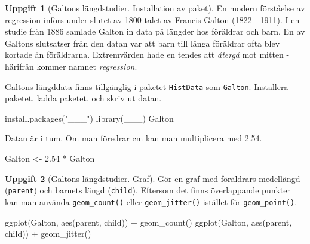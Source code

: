 \documentclass[
]{book}
\newenvironment{Shaded}{\begin{snugshade}}{\end{snugshade}}
\newcommand{\FloatTok}[1]{\textcolor[rgb]{0.00,0.00,0.81}{#1}}
\newcommand{\FunctionTok}[1]{\textcolor[rgb]{0.00,0.00,0.00}{#1}}
\newcommand{\NormalTok}[1]{#1}
\newcommand{\OtherTok}[1]{\textcolor[rgb]{0.56,0.35,0.01}{#1}}
\newcommand{\SpecialCharTok}[1]{\textcolor[rgb]{0.00,0.00,0.00}{#1}}
\newcommand{\StringTok}[1]{\textcolor[rgb]{0.31,0.60,0.02}{#1}}
\theoremstyle{definition}
\theoremstyle{definition}
\theoremstyle{definition}
\newtheorem{exercise}{Uppgift}[chapter]
\theoremstyle{definition}
\theoremstyle{remark}
\begin{document}
\begin{exercise}[Galtons längdstudier. Installation av paket]

En modern förståelse av regression införs under slutet av 1800-talet av Francis Galton (1822 - 1911). I en studie från 1886 samlade Galton in data på längder hos föräldrar och barn. En av Galtons slutsatser från den datan var att barn till långa föräldrar ofta blev kortade än föräldrarna. Extremvärden hade en tendes att \emph{återgå} mot mitten - härifrån kommer namnet \emph{regression}.

Galtons längddata finns tillgänglig i paketet \texttt{HistData} som \texttt{Galton}. Installera paketet, ladda paketet, och skriv ut datan.

\begin{Shaded}
\begin{Highlighting}[]
\FunctionTok{install.packages}\NormalTok{(}\StringTok{"\_\_\_"}\NormalTok{)}
\FunctionTok{library}\NormalTok{(\_\_\_)}
\NormalTok{Galton}
\end{Highlighting}
\end{Shaded}

Datan är i tum. Om man föredrar cm kan man multiplicera med 2.54.

\begin{Shaded}
\begin{Highlighting}[]
\NormalTok{Galton }\OtherTok{\textless{}{-}} \FloatTok{2.54} \SpecialCharTok{*}\NormalTok{ Galton}
\end{Highlighting}
\end{Shaded}

\end{exercise}

\begin{exercise}[Galtons längdstudier. Graf]

Gör en graf med föräldrars medellängd (\texttt{parent}) och barnets längd (\texttt{child}). Eftersom det finns överlappande punkter kan man använda \texttt{geom\_count()} eller \texttt{geom\_jitter()} istället för \texttt{geom\_point()}.

\begin{Shaded}
\begin{Highlighting}[]
\FunctionTok{ggplot}\NormalTok{(Galton, }\FunctionTok{aes}\NormalTok{(parent, child)) }\SpecialCharTok{+} \FunctionTok{geom\_count}\NormalTok{()}
\FunctionTok{ggplot}\NormalTok{(Galton, }\FunctionTok{aes}\NormalTok{(parent, child)) }\SpecialCharTok{+} \FunctionTok{geom\_jitter}\NormalTok{()}
\end{Highlighting}
\end{Shaded}

\end{exercise}
\end{document}
